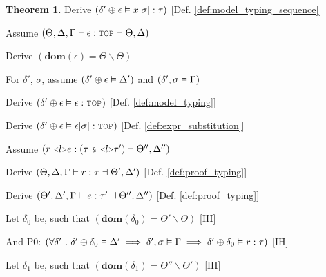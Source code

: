 \documentclass[acmsmall]{acmart}
\theoremstyle{definition}
\newtheorem{theorem}{Theorem}[section]
\begin{document}
\begin{theorem}
  \item \I\I \N Derive $(
    \delta' \oplus \epsilon \vDash x[\sigma] : \tau
  )$ [Def. \ref{def:model_typing_sequence}]


  \item \N Assume $(
    \Theta, \Delta, \Gamma \entails \epsilon \hastype \J{TOP} \given \Theta, \Delta
  )$

  \item \I \N Derive $(
    \textbf{dom}(\epsilon) = \Theta \backslash \Theta
  )$

  \item \I \N For $\delta'$, $\sigma$,
    assume $(\delta' \oplus \epsilon \vDash \Delta')$
    and $(\delta', \sigma \vDash \Gamma)$

  \item \I\I \N Derive $(
    \delta' \oplus \epsilon \satisfies \epsilon \hastype \J{TOP}
  )$ [Def. \ref{def:model_typing}]

  \item \I\I \N Derive $(
    \delta' \oplus \epsilon \satisfies \epsilon[\sigma] \hastype \J{TOP}
  )$ [Def. \ref{def:expr_substitution}]


  \item \N Assume $(
    r\ \J{<}l \J{>} e \hastype (\tau\ \J{\&}\ \J{<} l \J{>} \tau') \given \Theta'', \Delta''
  )$

  \item \I \N Derive $(
    \Theta, \Delta, \Gamma \vdash r : \tau \dashv \Theta', \Delta'
  )$ [Def. \ref{def:proof_typing}]

  \item \I \N Derive $(
    \Theta', \Delta', \Gamma \vdash e : \tau' \dashv \Theta'', \Delta''
  )$ [Def. \ref{def:proof_typing}]

  \item \I \N Let $\delta_0$ be, such that $(
    \textbf{dom}(\delta_0) = \Theta' \backslash \Theta
  )$ [IH]

  \item \I \N And P0: $(
    \forall \delta' \ .\  
    \delta' \oplus \delta_0 \vDash \Delta'
    \implies 
    \delta', \sigma \vDash \Gamma
    \implies 
    \delta' \oplus \delta_0 \vDash r : \tau 
  )$ [IH]

  \item \I \N Let $\delta_1$ be, such that $(
    \textbf{dom}(\delta_1) = \Theta'' \backslash \Theta'
  )$ [IH]


\end{theorem}
\end{document}
